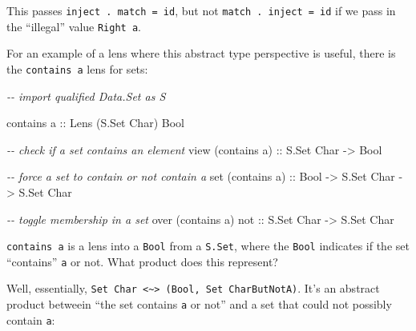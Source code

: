 \documentclass[]{article}
\newenvironment{Shaded}{}{}
\newcommand{\CharTok}[1]{\textcolor[rgb]{0.25,0.44,0.63}{#1}}
\newcommand{\CommentTok}[1]{\textcolor[rgb]{0.38,0.63,0.69}{\textit{#1}}}
\newcommand{\DataTypeTok}[1]{\textcolor[rgb]{0.56,0.13,0.00}{#1}}
\newcommand{\NormalTok}[1]{#1}
\newcommand{\OtherTok}[1]{\textcolor[rgb]{0.00,0.44,0.13}{#1}}
\begin{document}
This passes \texttt{inject\ .\ match\ =\ id}, but not
\texttt{match\ .\ inject\ =\ id} if we pass in the ``illegal'' value
\texttt{Right\ \textquotesingle{}a\textquotesingle{}}.

For an example of a lens where this abstract type perspective is useful, there
is the \texttt{contains\ \textquotesingle{}a\textquotesingle{}} lens for sets:

\begin{Shaded}
\begin{Highlighting}[]
\CommentTok{{-}{-} import qualified Data.Set as S}

\NormalTok{contains }\CharTok{\textquotesingle{}a\textquotesingle{}}\OtherTok{ ::} \DataTypeTok{Lens\textquotesingle{}}\NormalTok{ (}\DataTypeTok{S.Set} \DataTypeTok{Char}\NormalTok{) }\DataTypeTok{Bool}

\CommentTok{{-}{-} check if a set contains an element}
\NormalTok{view (contains }\CharTok{\textquotesingle{}a\textquotesingle{}}\NormalTok{)}\OtherTok{ ::} \DataTypeTok{S.Set} \DataTypeTok{Char} \OtherTok{{-}\textgreater{}} \DataTypeTok{Bool}

\CommentTok{{-}{-} force a set to contain or not contain \textquotesingle{}a\textquotesingle{}}
\NormalTok{set (contains }\CharTok{\textquotesingle{}a\textquotesingle{}}\NormalTok{)}\OtherTok{ ::} \DataTypeTok{Bool} \OtherTok{{-}\textgreater{}} \DataTypeTok{S.Set} \DataTypeTok{Char} \OtherTok{{-}\textgreater{}} \DataTypeTok{S.Set} \DataTypeTok{Char}

\CommentTok{{-}{-} toggle membership in a set}
\NormalTok{over (contains }\CharTok{\textquotesingle{}a\textquotesingle{}}\NormalTok{)}\OtherTok{ not ::} \DataTypeTok{S.Set} \DataTypeTok{Char} \OtherTok{{-}\textgreater{}} \DataTypeTok{S.Set} \DataTypeTok{Char}
\end{Highlighting}
\end{Shaded}

\texttt{contains\ \textquotesingle{}a\textquotesingle{}} is a lens into a
\texttt{Bool} from a \texttt{S.Set}, where the \texttt{Bool} indicates if the
set ``contains'' \texttt{a} or not. What product does this represent?

Well, essentially,
\texttt{Set\ Char\ \textless{}\textasciitilde{}\textgreater{}\ (Bool,\ Set\ CharButNotA)}.
It's an abstract product betweein ``the set contains
\texttt{\textquotesingle{}a\textquotesingle{}} or not'' and a set that could not
possibly contain \texttt{\textquotesingle{}a\textquotesingle{}}:
\end{document}

